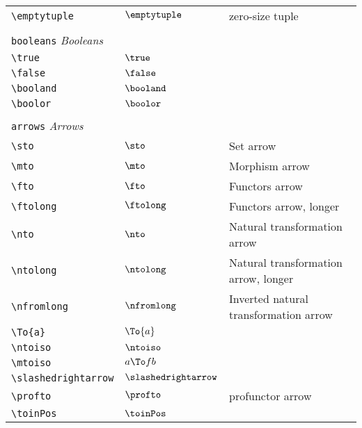 \begin{longtable}{lll}
 {\color[rgb]{0.5,0.5,0.5}\texttt{\textbackslash emptytuple}} & $\emptytuple$ &  zero-size tuple\\ 
  &  & \\ 
 \multicolumn{3}{l}{{\color[rgb]{0.5,0.5,0.5}\texttt{booleans}} \emph{Booleans}}\\ 
 \hline
\hline
{\color[rgb]{0.5,0.5,0.5}\texttt{\textbackslash true}} & $\true$ & \\ 
 {\color[rgb]{0.5,0.5,0.5}\texttt{\textbackslash false}} & $\false$ & \\ 
 {\color[rgb]{0.5,0.5,0.5}\texttt{\textbackslash booland}} & $\booland$ & \\ 
 {\color[rgb]{0.5,0.5,0.5}\texttt{\textbackslash boolor}} & $\boolor$ & \\ 
  &  & \\ 
 \multicolumn{3}{l}{{\color[rgb]{0.5,0.5,0.5}\texttt{arrows}} \emph{Arrows}}\\ 
 \hline
\hline
{\color[rgb]{0.5,0.5,0.5}\texttt{\textbackslash sto}} & $\sto$ &  Set arrow\\ 
 {\color[rgb]{0.5,0.5,0.5}\texttt{\textbackslash mto}} & $\mto$ &  Morphism arrow\\ 
 {\color[rgb]{0.5,0.5,0.5}\texttt{\textbackslash fto}} & $\fto$ &  Functors arrow\\ 
 {\color[rgb]{0.5,0.5,0.5}\texttt{\textbackslash ftolong}} & $\ftolong$ &  Functors arrow, longer\\ 
 {\color[rgb]{0.5,0.5,0.5}\texttt{\textbackslash nto}} & $\nto$ &  Natural transformation arrow\\ 
 {\color[rgb]{0.5,0.5,0.5}\texttt{\textbackslash ntolong}} & $\ntolong$ &  Natural transformation arrow, longer\\ 
 {\color[rgb]{0.5,0.5,0.5}\texttt{\textbackslash nfromlong}} & $\nfromlong$ &  Inverted natural transformation arrow\\ 
 {\color[rgb]{0.5,0.5,0.5}\texttt{\textbackslash To\{a\}}} & $\To{a}$ & \\ 
 {\color[rgb]{0.5,0.5,0.5}\texttt{\textbackslash ntoiso}} & $\ntoiso$ & \\ 
 {\color[rgb]{0.5,0.5,0.5}\texttt{\textbackslash mtoiso}} & $a \To f b$ & \\ 
 {\color[rgb]{0.5,0.5,0.5}\texttt{\textbackslash slashedrightarrow}} & $\slashedrightarrow$ & \\ 
 {\color[rgb]{0.5,0.5,0.5}\texttt{\textbackslash profto}} & $\profto$ &  profunctor arrow\\ 
 {\color[rgb]{0.5,0.5,0.5}\texttt{\textbackslash toinPos}} & $\toinPos$ & \\ 

\end{longtable}
